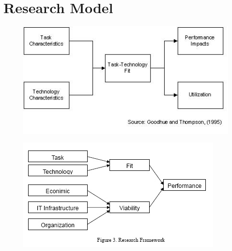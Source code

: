 \section{Research Model}


\begin{figure}[ht]
    \includegraphics[width=0.7\linewidth]{images/methodology/ttf.jpg}\centering
    \caption{\cite{Goodhue1995Task-TechnologyPerformance}}
\end{figure}

\begin{figure}[ht]
    \includegraphics[width=0.7\linewidth]{images/methodology/fvm.jpg}\centering
    \caption{\cite{Liang2007AdoptionModel}}
\end{figure}